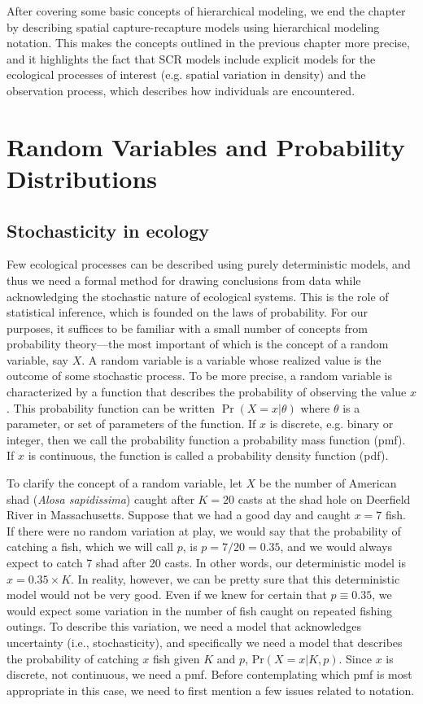After covering some basic concepts of hierarchical modeling, we end the
chapter by describing spatial capture-recapture models using
hierarchical modeling notation. This makes the concepts outlined in
the previous chapter more precise, and it highlights the fact that SCR
models include explicit models for the ecological
processes of interest (e.g. spatial variation in density) and the
observation process, which describes how individuals are encountered.

\section{Random Variables and Probability Distributions}

\subsection{Stochasticity in ecology}

Few ecological processes can be described using purely deterministic
models, and thus we need a formal method for drawing conclusions from data while
acknowledging the stochastic nature of ecological systems.
This is the role of statistical inference,
which is founded on the laws of probability. For our purposes, it
suffices to be familiar with a small number of concepts from
probability theory---the most important of which is the concept of a random
variable, say $X$. A random variable is a variable whose realized
value is the outcome of some stochastic process. To be more precise, a
random variable is characterized by a function that describes the
probability of observing the value $x$. This probability function can
be written $\Pr(X=x|\theta)$ where $\theta$ is a parameter, or set of
parameters of the function. If $x$ is discrete, e.g. binary or
integer, then we call the probability function a probability mass
function (pmf). If $x$ is continuous, the function is called a
probability density function (pdf).

To clarify the concept of a random variable, let $X$ be the number of
American shad (\emph{Alosa sapidissima}) caught after $K=20$ casts at
the shad hole on Deerfield River in Massachusetts. Suppose that
we had a good day and caught $x=7$ fish. If there were no random
variation at play, we would say that the probability of catching a
fish, which we will call $p$, is $p=7/20=0.35$, and we would
always expect to catch 7 shad after 20
casts. In other words, our deterministic model is $x =
0.35\times K$. In reality, however, we can be pretty sure that this
deterministic model would not be very good. Even if we knew for
certain that $p \equiv 0.35$, we would expect some variation in the number
of fish caught on repeated fishing outings. To describe this
variation, we need a model that acknowledges uncertainty (i.e.,
stochasticity), and specifically we need a model that describes the
probability of catching $x$ fish given $K$ and $p$,
$\text{Pr}(X=x|K,p)$. Since $x$ is discrete, not continuous, we need a
pmf. Before contemplating which pmf is most appropriate in this case,
we need to first mention a few issues related to notation.

